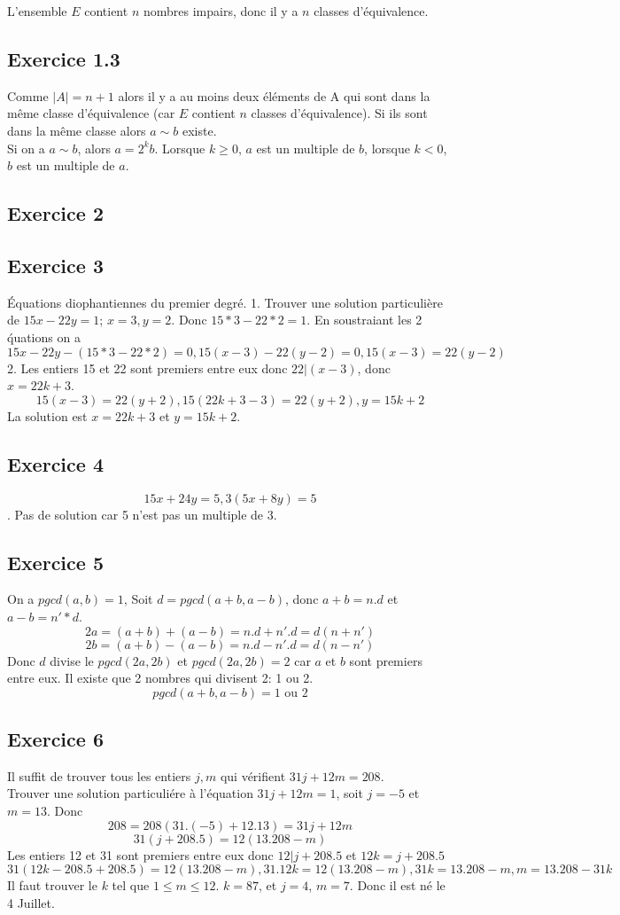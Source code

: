 \documentclass[]{book}
\theoremstyle{definition}
\begin{document}
L'ensemble $E$ contient $n$ nombres impairs, donc il y a $n$ classes d'\'equivalence.

\subsection*{Exercice 1.3}
Comme $|A| = n+1$ alors il y a au moins deux \'el\'ements de A qui sont dans la m\^eme classe d'\'equivalence (car $E$ contient $n$ classes d'\'equivalence). Si ils sont dans la m\^eme classe alors $a \sim b$ existe.\\

Si on a $a \sim b$, alors $a=2^kb$. Lorsque $k\geq 0$, $a$ est un multiple de $b$, lorsque $k<0$, $b$ est un multiple de $a$.

\subsection*{Exercice 2}

\subsection*{Exercice 3}
\'Equations diophantiennes du premier degr\'e.
1. Trouver une solution particuli\`ere de $15x - 22y = 1$; $x=3, y=2$. Donc $15*3-22*2 = 1$. En soustraiant les 2 \'quations on a 
$$15x - 22y - (15*3-22*2) = 0, 15(x-3) - 22(y-2) = 0, 15(x-3) = 22(y-2)$$
2. Les entiers 15 et 22 sont premiers entre eux donc $22|(x-3)$, donc $x= 22k+3$.
$$15(x-3) = 22(y+2), 15(22k+3-3) = 22(y+2), y = 15k+2$$
La solution est $x=22k+3$ et $y=15k+2$.

\subsection*{Exercice 4}
$$15x+24y = 5, 3(5x+8y) = 5$$.
Pas de solution car 5 n'est pas un multiple de 3.

\subsection*{Exercice 5}
On a $pgcd(a,b) = 1$, Soit $d=pgcd(a+b,a-b)$, donc $a+b=n.d$ et $a-b=n'*d$.
$$2a = (a+b)+(a-b) = n.d+n'.d = d(n+n')$$
$$2b = (a+b)-(a-b) = n.d-n'.d = d(n-n')$$
Donc $d$ divise le $pgcd(2a, 2b)$ et $pgcd(2a, 2b)=2$ car $a$ et $b$ sont premiers entre eux. Il existe que 2 nombres qui divisent 2: 1 ou 2.
$$pgcd(a+b,a-b) = 1 \text{ ou } 2$$ 

\subsection*{Exercice 6}
Il suffit de trouver tous les entiers $j,m$ qui v\'erifient $31j+12m=208$.\\
Trouver une solution particuli\'ere \`a l'\'equation $31j+12m=1$, soit $j=-5$ et $m=13$. Donc 
$$208 = 208(31.(-5) + 12.13) =  31j + 12m$$
$$31(j+208.5) = 12(13.208-m)$$
Les entiers 12 et 31 sont premiers entre eux donc $12|j+208.5$ et $12k=j+208.5$
$$31(12k-208.5+208.5) = 12(13.208-m), 31.12k=12(13.208-m), 31k = 13.208-m, m=13.208-31k$$
Il faut trouver le $k$ tel que $1\leq m\leq 12$. $k=87$, et $j=4$, $m=7$. Donc il est n\'e le 4 Juillet.
\end{document}

